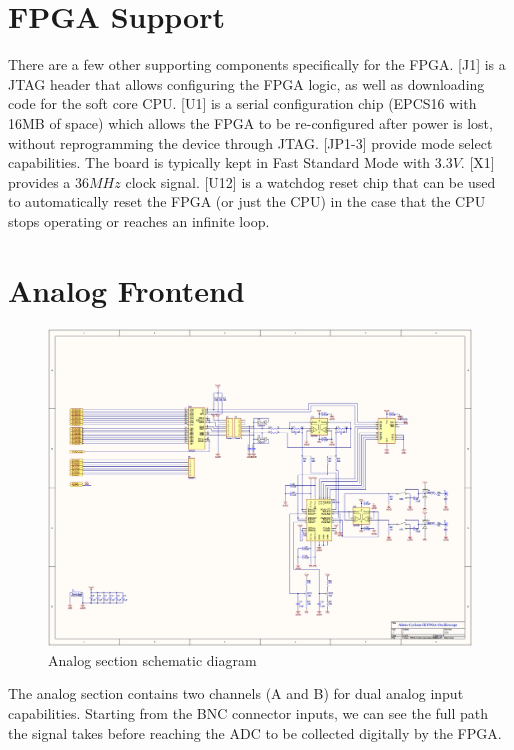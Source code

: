 \section{FPGA Support}

There are a few other supporting components specifically for the FPGA. [J1] is a JTAG header that allows configuring the FPGA logic, as well as downloading code for the soft core CPU. [U1] is a serial configuration chip (EPCS16 with 16MB of space) which allows the FPGA to be re-configured after power is lost, without reprogramming the device through JTAG. [JP1-3] provide mode select capabilities. The board is typically kept in Fast Standard Mode with $3.3V$. [X1] provides a $36MHz$ clock signal. [U12] is a watchdog reset chip that can be used to automatically reset the FPGA (or just the CPU) in the case that the CPU stops operating or reaches an infinite loop.

\section{Analog Frontend}

\begin{figure}[ht!]
    \centering
    \includegraphics[width=6in]{circuit/analog.png}
		\caption{Analog section schematic diagram}
\end{figure}

The analog section contains two channels (A and B) for dual analog input capabilities. Starting from the BNC connector inputs, we can see the full path the signal takes before reaching the ADC to be collected digitally by the FPGA.

